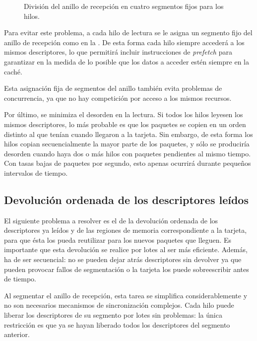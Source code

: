\documentclass[oneside, draft]{epstfg}
\begin{document}
\begin{wrapfigure}[9]{R}{0.3\textwidth}
\centering
\vspace{-20pt}

\caption{División del anillo de recepción en cuatro segmentos fijos para los hilos.}
\label{fig:RingAssignment}
\end{wrapfigure}

Para evitar este problema, a cada hilo de lectura se le asigna un segmento fijo del anillo de recepción como en la . De esta forma cada hilo siempre accederá a los mismos descriptores, lo que permitirá incluir instrucciones de \textit{prefetch} para garantizar en la medida de lo posible que los datos a acceder estén siempre en la caché.

Esta asignación fija de segmentos del anillo también evita problemas de concurrencia, ya que no hay competición por acceso a los mismos recursos.

Por último, se minimiza el desorden en la lectura. Si todos los hilos leyesen los mismos descriptores, lo más probable es que los paquetes se copien en un orden distinto al que tenían cuando llegaron a la tarjeta. Sin embargo, de esta forma los hilos copian secuencialmente la mayor parte de los paquetes, y sólo se produciría desorden cuando haya dos o más hilos con paquetes pendientes al mismo tiempo. Con tasas bajas de paquetes por segundo, esto apenas ocurrirá durante pequeños intervalos de tiempo.

\subsection{Devolución ordenada de los descriptores leídos}

El siguiente problema a resolver es el de la devolución ordenada de los descriptores ya leídos y de las regiones de memoria correspondiente a la tarjeta, para que ésta los pueda reutilizar para los nuevos paquetes que lleguen. Es importante que esta devolución se realice por lotes al ser más eficiente. Además, ha de ser secuencial: no se pueden dejar atrás descriptores sin devolver ya que pueden provocar fallos de segmentación o la tarjeta los puede sobreescribir antes de tiempo.

Al segmentar el anillo de recepción, esta tarea se simplifica considerablemente y no son necesarios mecanismos de sincronización complejos. Cada hilo puede liberar los descriptores de su segmento por lotes sin problemas: la única restricción es que ya se hayan liberado todos los descriptores del segmento anterior.
\end{document}
